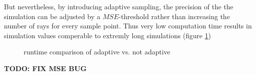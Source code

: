 But nevertheless, by introducing adaptive sampling, the precision of the the simulation
can be adjusted by a $MSE$-threshold rather than increasing the number
of rays for every sample point. Thus very low computation time results in
simulation values comperable to extremly long simulations (figure \ref{plot:adaptive_runtime})\\
\begin{figure}[H]
  \centerline{
    }
  \caption{runtime comparison of adaptive vs. not adaptive }
  \label{plot:adaptive_runtime}
\end{figure}

\textbf{TODO: FIX MSE BUG}

